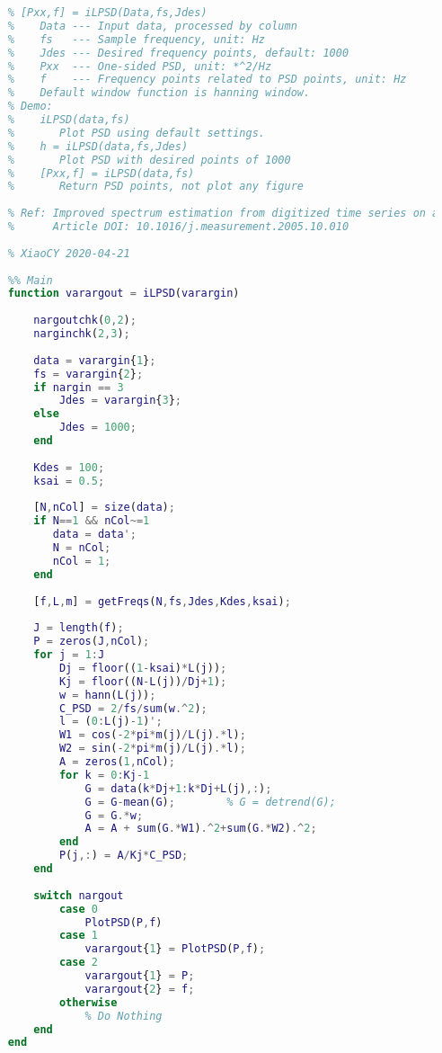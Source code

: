 \begin{lstlisting}[language=Matlab]
    % Use LPSD mothod to plot power spectral density
    % [Pxx,f] = iLPSD(Data,fs,Jdes)
    %    Data --- Input data, processed by column
    %    fs   --- Sample frequency, unit: Hz
    %    Jdes --- Desired frequency points, default: 1000
    %    Pxx  --- One-sided PSD, unit: *^2/Hz
    %    f    --- Frequency points related to PSD points, unit: Hz
    %    Default window function is hanning window.
    % Demo:
    %    iLPSD(data,fs)
    %       Plot PSD using default settings.
    %    h = iLPSD(data,fs,Jdes)
    %       Plot PSD with desired points of 1000
    %    [Pxx,f] = iLPSD(data,fs)
    %       Return PSD points, not plot any figure
    
    % Ref: Improved spectrum estimation from digitized time series on a logarithmic frequency axis
    %      Article DOI: 10.1016/j.measurement.2005.10.010
    
    % XiaoCY 2020-04-21
    
    %% Main
    function varargout = iLPSD(varargin)
        
        nargoutchk(0,2);
        narginchk(2,3);
        
        data = varargin{1};
        fs = varargin{2};
        if nargin == 3
            Jdes = varargin{3};
        else
            Jdes = 1000;
        end
        
        Kdes = 100;
        ksai = 0.5;
        
        [N,nCol] = size(data);
        if N==1 && nCol~=1
           data = data';
           N = nCol;
           nCol = 1;
        end
        
        [f,L,m] = getFreqs(N,fs,Jdes,Kdes,ksai);
        
        J = length(f);
        P = zeros(J,nCol);
        for j = 1:J
            Dj = floor((1-ksai)*L(j));
            Kj = floor((N-L(j))/Dj+1);
            w = hann(L(j));
            C_PSD = 2/fs/sum(w.^2);
            l = (0:L(j)-1)';
            W1 = cos(-2*pi*m(j)/L(j).*l);
            W2 = sin(-2*pi*m(j)/L(j).*l);
            A = zeros(1,nCol);
            for k = 0:Kj-1
                G = data(k*Dj+1:k*Dj+L(j),:);
                G = G-mean(G);        % G = detrend(G);   
                G = G.*w;
                A = A + sum(G.*W1).^2+sum(G.*W2).^2;
            end
            P(j,:) = A/Kj*C_PSD;
        end
        
        switch nargout
            case 0
                PlotPSD(P,f)
            case 1
                varargout{1} = PlotPSD(P,f);
            case 2
                varargout{1} = P;
                varargout{2} = f;
            otherwise
                % Do Nothing
        end
    end
    

\end{lstlisting}
